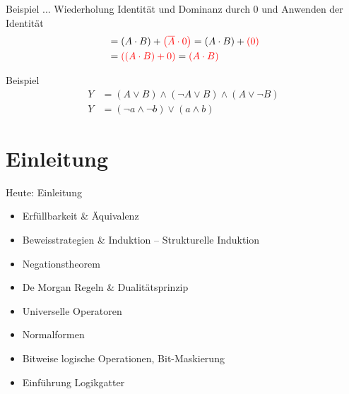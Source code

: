 \documentclass[12pt%
,aspectratio=169%
]{beamer}
\begin{document}
\begin{frame}{Beispiel}
... Wiederholung Identität und Dominanz durch $0$ und Anwenden der Identität
\begin{align*}
&= \left(A \cdot B\right) + \textcolor{red}{\left(\overline{A} \cdot 0\right)} = \left(A \cdot B\right) + \textcolor{red}{\left(0\right)}\\
&= \textcolor{red}{\left(\left(A \cdot B\right) + 0\right)} = \textcolor{red}{\left(A \cdot B\right)}
\end{align*}
\end{frame}



\begin{frame}{Beispiel}
\begin{align*}
Y &= (A \lor B) \land (\neg A \lor B) \land (A \lor \neg B)\\
Y &= (\neg a \land \neg b) \lor (a \land b)
\end{align*}
\end{frame}


\section{Einleitung}
\begin{frame}{Heute: Einleitung}
\begin{itemize}
	\item Erfüllbarkeit \& Äquivalenz
	\item Beweisstrategien \& Induktion -- Strukturelle Induktion
	\item Negationstheorem
	\item De Morgan Regeln \& Dualitätsprinzip
	\item Universelle Operatoren
	\item Normalformen
	\item Bitweise logische Operationen, Bit-Maskierung
	\item Einführung Logikgatter
\end{itemize}
\end{frame}
\end{document}
